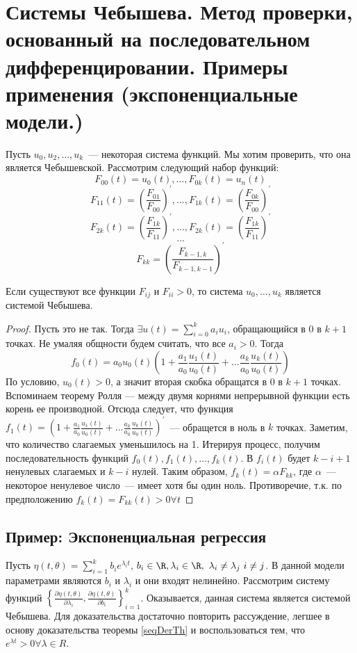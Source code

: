 
\section{Системы Чебышева. Метод проверки, основанный на последовательном дифференцировании. Примеры применения (экспоненциальные модели.)}

Пусть $u_0, u_2,…, u_k$ — некоторая система функций. Мы хотим проверить, что она является Чебышевской. 
Рассмотрим следующий набор функций:
$$ F_{00}(t) = u_0(t), …, F_{0k}(t) = u_n(t)$$
$$F_{11}(t) = \left(\frac{F_{01}}{F_{00}}\right)^{'}, …, F_{1k}(t) = \left(\frac{F_{0k}}{F_{00}}\right)^{'}$$
$$F_{2k}(t) = \left(\frac{F_{1k}}{F_{11}}\right)^{'}, …, F_{2k}(t) = \left(\frac{F_{1k}}{F_{11}}\right)^{'} $$
$$ … $$
$$F_{kk} = \left(\frac{F_{k-1, k}}{F_{k-1, k-1}}\right)^{'}$$
\begin{thm}
\label{seqDerTh}
Если существуют все функции $F_{ij}$ и $F_{ii} > 0$, то система $u_0, …, u_k$ является системой Чебышева.
\end{thm}
\begin{proof}
Пусть это не так. Тогда $\exists u(t) = \sum \limits_{i=0}^{k} a_i u_i$, обращающийся в 0 в $k+1$ точках. Не умаляя общности будем считать, что все $a_i > 0$. Тогда 
$$ f_0(t) = a_0u_0(t)\left(1 + \frac{a_1}{a_0} \frac{u_1(t)}{u_0(t)} + … \frac{a_k}{a_0}\frac{u_k(t)}{u_0(t)}\right)$$
По условию, $u_0(t) > 0$, а значит вторая скобка обращатся в 0 в $k+1$ точках. Вспоминаем теорему Ролля — между двумя корнями непрерывной функции есть корень ее производной. Отсюда следует, что функция 
$f_1(t) = \left(1 + \frac{a_1}{a_0} \frac{u_1(t)}{u_0(t)} + … \frac{a_k}{a_0}\frac{u_k(t)}{u_0(t)}\right)^{'}$ — обращется в ноль в $k$ точках. Заметим, что количество слагаемых уменьшилось на 1. Итерируя процесс, получим 
последовательность функций $f_0(t), f_1(t), …, f_k(t)$. В $f_i(t)$ будет $k-i+1$ ненулевых слагаемых и $k-i$ нулей. Таким образом, $f_k(t) = \alpha F_{kk}$, где $\alpha$ — некоторое ненулевое число — имеет хотя бы один ноль. Противоречие, т.к. по предположению $f_k(t) = F_{kk}(t) > 0 \forall t$
\end{proof}
\subsection{Пример: Экспоненциальная регрессия}
Пусть $\eta(t, \theta) = \sum\limits_{i=1}^k b_i e^{\lambda_it}$, $b_i \in \R, \lambda_i \in \R, \lambda_i \neq \lambda_j i \neq j$. В данной модели параметрами являются $b_i$ и $\lambda_i$ и они входят нелинейно. Рассмотрим систему функций 
$\left\{ \frac{\partial \eta(t, \theta)}{\partial \lambda_i}, \frac{\partial \eta(t, \theta)}{\partial b_i} \right\}_{i=1}^{k}$. Оказывается, данная система является системой Чебышева. Для доказательства достаточно повторить рассуждение, легшее в основу доказательства теоремы \eqref{seqDerTh} и воспользоваться тем, что $e^{\lambda t} > 0 \forall \lambda \in R$.


